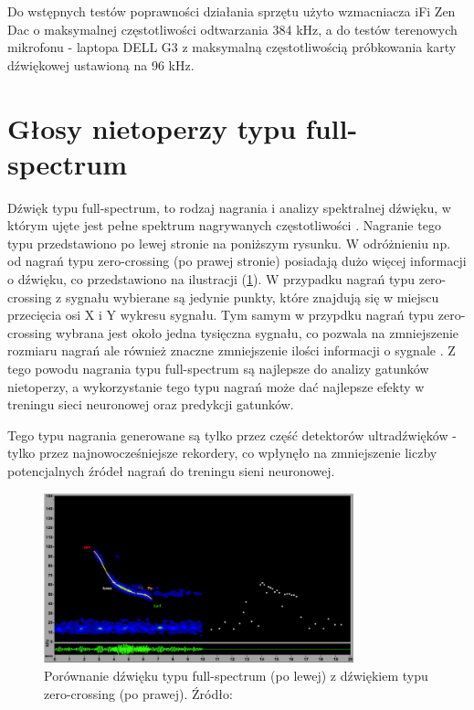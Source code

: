 \documentclass{sprz}
\begin{document}
Do wstępnych testów poprawności działania sprzętu użyto wzmacniacza iFi Zen Dac o maksymalnej częstotliwości odtwarzania 384 kHz, a do testów terenowych mikrofonu - laptopa DELL G3 z maksymalną częstotliwością próbkowania karty dźwiękowej ustawioną na 96 kHz.

\section{Głosy nietoperzy typu full-spectrum}
Dźwięk typu full-spectrum, to rodzaj nagrania i analizy spektralnej dźwięku, w którym ujęte jest pełne spektrum nagrywanych częstotliwości \cite{fullspectrum}. Nagranie tego typu przedstawiono po lewej stronie na poniższym rysunku. W odróżnieniu np. od nagrań typu zero-crossing (po prawej stronie) posiadają dużo więcej informacji o dźwięku, co przedstawiono na ilustracji (\ref{img:fullspectrum}). W przypadku nagrań typu zero-crossing z sygnału wybierane są jedynie punkty, które znajdują się w miejscu przecięcia osi X i Y wykresu sygnału. Tym samym w przypdku nagrań typu zero-crossing wybrana jest około jedna tysięczna sygnału, co pozwala na zmniejszenie rozmiaru nagrań ale również znaczne zmniejszenie ilości informacji o sygnale \cite{fullspectrum}. Z tego powodu nagrania typu full-spectrum są najlepsze do analizy gatunków nietoperzy, a wykorzystanie tego typu nagrań może dać najlepsze efekty w treningu sieci neuronowej oraz predykcji gatunków.

Tego typu nagrania generowane są tylko przez część detektorów ultradźwięków - tylko przez najnowocześniejsze rekordery, co wpłynęło na zmniejszenie liczby potencjalnych źródeł nagrań do treningu sieni neuronowej.

\begin{figure}[h]
  \centering
  \includegraphics[width=0.8\textwidth]{sprz/fullspectrum.png}
  \caption{Porównanie dźwięku typu full-spectrum (po lewej) z dźwiękiem typu zero-crossing (po prawej). Źródło: \cite{fullspectrum}}
  \label{img:fullspectrum}
\end{figure} 
\end{document}
